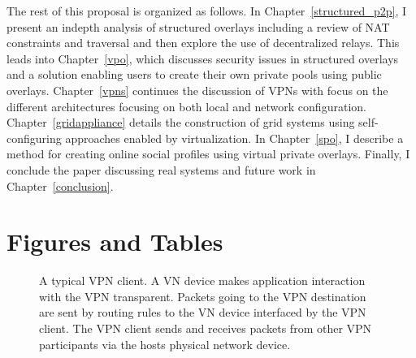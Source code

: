 The rest of this proposal is organized as follows.  In
Chapter~\ref{structured_p2p}, I present an indepth analysis of structured
overlays including a review of NAT constraints and traversal and then explore
the use of decentralized relays.  This leads into Chapter~\ref{vpo}, which
discusses security issues in structured overlays and a solution enabling users
to create their own private pools using public overlays.  Chapter~\ref{vpns}
continues the discussion of VPNs with focus on the different architectures 
focusing on both local and network configuration.  Chapter~\ref{gridappliance}
details the construction of grid systems using self-configuring approaches
enabled by virtualization.  In Chapter~\ref{spo}, I describe a method for
creating online social profiles using virtual private overlays.  Finally, I
conclude the paper discussing real systems and future work in
Chapter~\ref{conclusion}.

\section{Figures and Tables}
\begin{figure}[ht]
\centering
{}
\caption[A typical VPN client]{A typical VPN client.  A VN device makes
application interaction with the VPN transparent.  Packets going to the VPN
destination are sent by routing rules to the VN device interfaced by the VPN
client.  The VPN client sends and receives packets from other VPN participants
via the hosts physical network device.}
\label{fig:vpn}
\end{figure}
